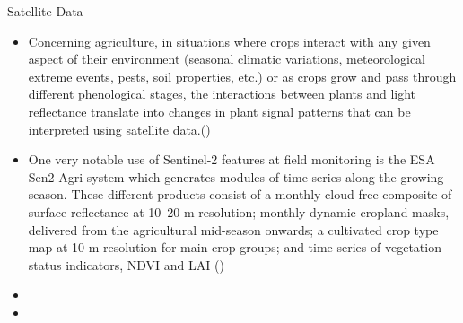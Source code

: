 \documentclass[12pt, letterpaper]{article}
\begin{document}
Satellite Data
\begin{itemize}
  \item Concerning agriculture, in situations where crops interact with any given aspect of their environment (seasonal climatic variations, meteorological extreme events, pests, soil properties, etc.) or as crops grow and pass through different phenological stages, the interactions between plants and light reflectance translate into changes in plant signal patterns that can be interpreted using satellite data.(\textbf{\cite{segarra_remote_2020}})
  \item One very notable use of Sentinel-2 features at field monitoring is the ESA Sen2-Agri system which generates modules of time series along the growing season. These different products consist of a monthly cloud-free composite of surface reflectance at 10–20 m resolution; monthly dynamic cropland masks, delivered from the agricultural mid-season onwards; a cultivated crop type map at 10 m resolution for main crop groups; and time series of vegetation status indicators, NDVI and LAI (\textbf{\cite{segarra_remote_2020}})
  \item
  \item
\end{itemize}


\clearpage
\thispagestyle{plain} 
\printbibliography
\end{document}
